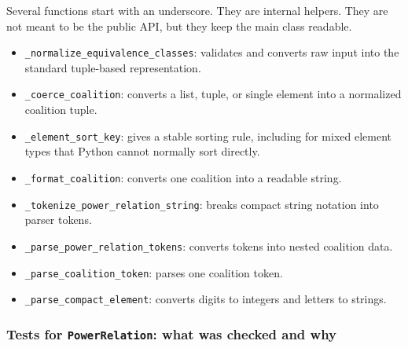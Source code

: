 \documentclass[11pt]{article}
\begin{document}
Several functions start with an underscore. They are internal helpers. They are
not meant to be the public API, but they keep the main class readable.

\begin{itemize}
  \item \texttt{\_normalize\_equivalence\_classes}: validates and converts raw
  input into the standard tuple-based representation.
  \item \texttt{\_coerce\_coalition}: converts a list, tuple, or single element
  into a normalized coalition tuple.
  \item \texttt{\_element\_sort\_key}: gives a stable sorting rule, including
  for mixed element types that Python cannot normally sort directly.
  \item \texttt{\_format\_coalition}: converts one coalition into a readable
  string.
  \item \texttt{\_tokenize\_power\_relation\_string}: breaks compact string
  notation into parser tokens.
  \item \texttt{\_parse\_power\_relation\_tokens}: converts tokens into nested
  coalition data.
  \item \texttt{\_parse\_coalition\_token}: parses one coalition token.
  \item \texttt{\_parse\_compact\_element}: converts digits to integers and
  letters to strings.
\end{itemize}

\subsubsection*{Tests for \texttt{PowerRelation}: what was checked and why}
\end{document}
